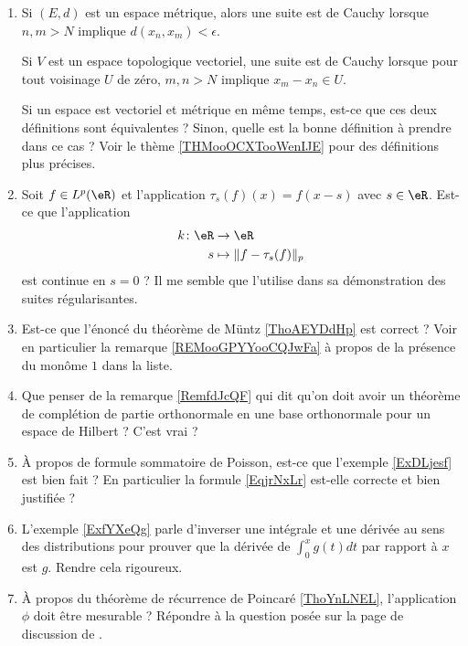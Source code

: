 \begin{enumerate}
    \item
        Si \( (E,d)\) est un espace métrique, alors une suite est de Cauchy lorsque \( n,m>N\) implique \( d(x_n,x_m)<\epsilon\).

        Si \( V\) est un espace topologique vectoriel, une suite est de Cauchy lorsque pour tout voisinage \( U\) de zéro, \( m,n>N\) implique \( x_m-x_n\in U\).

        Si un espace est vectoriel et métrique en même temps, est-ce que ces deux définitions sont équivalentes ? Sinon, quelle est la bonne définition à prendre dans ce cas ? Voir le thème \ref{THMooOCXTooWenIJE} pour des définitions plus précises.
    \item
        Soit \( f\in L^p(\eR)\) et l'application \( \tau_s(f)(x)=f(x-s)\) avec \( s\in \eR\). Est-ce que l'application
        \begin{equation}
            \begin{aligned}
                k\colon \eR&\to \eR \\
                s&\mapsto \| f-\tau_s(f) \|_p 
            \end{aligned}
        \end{equation}
        est continue en \( s=0\) ? Il me semble que \cite{ooYTNMooJsvznx} l'utilise dans sa démonstration des suites régularisantes.
    \item
        Est-ce que l'énoncé du théorème de Müntz \ref{ThoAEYDdHp} est correct ? Voir en particulier la remarque \ref{REMooGPYYooCQJwFa} à propos de la présence du monôme  \( 1\) dans la liste.
    \item
        Que penser de la remarque \ref{RemfdJcQF} qui dit qu'on doit avoir un théorème de complétion de partie orthonormale en une base orthonormale pour un espace de Hilbert ? C'est vrai ?
    \item
        À propos de formule sommatoire de Poisson, est-ce que l'exemple \ref{ExDLjesf} est bien fait ? En particulier la formule \eqref{EqjrNxLr} est-elle correcte et bien justifiée ?
    \item 
        L'exemple \ref{ExfYXeQg} parle d'inverser une intégrale et une dérivée au sens des distributions pour prouver que la dérivée de \( \int_0^xg(t)dt\) par rapport à \( x\) est \( g\). Rendre cela rigoureux.
    \item
        À propos du théorème de récurrence de Poincaré \ref{ThoYnLNEL}, l'application \( \phi\) doit être mesurable ? Répondre à la question posée sur la page de discussion de .

\end{enumerate}
